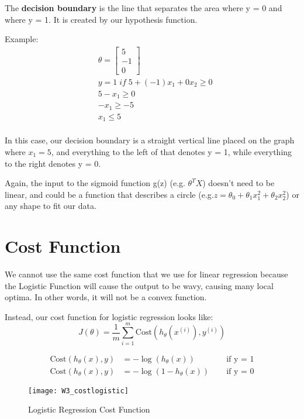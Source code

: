 The {\bf decision boundary} is the line that separates the area where y = 0 and where y = 1. It is created by our hypothesis function.

Example:
\begin{align*}
& \theta = 
\begin{bmatrix}
5 \\ 
-1 \\ 
0
\end{bmatrix} \\ 
& y = 1 \; if \; 5 + (-1) x_1 + 0 x_2 \geq 0 \\ 
& 5 - x_1 \geq 0 \\ 
& - x_1 \geq -5 \\
& x_1 \leq 5 \\ 
\end{align*}

In this case, our decision boundary is a straight vertical line placed on the graph where $x_1 = 5$, and everything to the left of that denotes y = 1, while everything to the right denotes y = 0.

Again, the input to the sigmoid function g(z) (e.g. $\theta^T X$) doesn't need to be linear, and could be a function that describes a circle (e.g.$ z = \theta_0 + \theta_1 x_1^2 +\theta_2 x_2^2$) or any shape to fit our data.

\section*{Cost Function}
We cannot use the same cost function that we use for linear regression because the Logistic Function will cause the output to be wavy, causing many local optima. In other words, it will not be a convex function.

Instead, our cost function for logistic regression looks like:
\begin{equation}
J(\theta) = \dfrac{1}{m} \sum_{i=1}^m \mathrm{Cost}(h_\theta(x^{(i)}),y^{(i)})
\end{equation}

\begin{align*}
\mathrm{Cost}(h_\theta(x),y) &= -\log(h_\theta(x)) \; \quad& \text{if y = 1} \\ 
\mathrm{Cost}(h_\theta(x),y) &= -\log(1-h_\theta(x)) \; \quad& \text{if y = 0}
\end{align*}

\begin{figure}[ht]
\center
\texttt{[image: W3\_costlogistic]}
\caption{Logistic Regression Cost Function}
\label{fig:W3_cost}
\end{figure}

